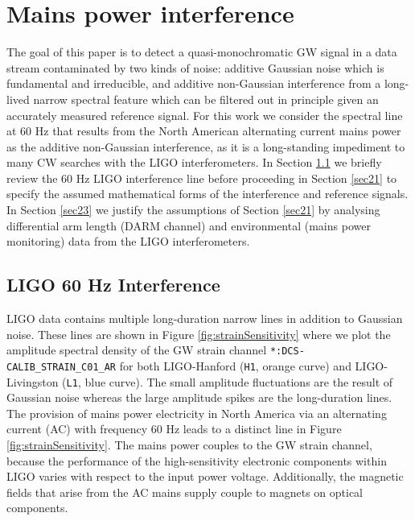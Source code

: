 \documentclass[pra,superscriptaddress,reprint,amsmath,amssymb,nofootinbib]{revtex4-2}
\begin{document}
\section{Mains power interference} \label{sec:pgi}
The goal of this paper is to detect a quasi-monochromatic GW signal in a data stream contaminated by two kinds of noise: additive Gaussian noise which is fundamental and irreducible, and additive non-Gaussian interference from a long-lived narrow spectral feature which can be filtered out in principle given an accurately measured reference signal. For this work we consider the spectral line at 60 Hz that results from the North American alternating current mains power as the additive non-Gaussian interference, as it is a long-standing impediment to many CW searches with the LIGO interferometers. In Section \ref{sec22} we briefly review the 60 Hz LIGO interference line before proceeding in Section \ref{sec21} to specify the assumed mathematical forms of the interference and reference signals. In Section \ref{sec23} we justify the assumptions of Section \ref{sec21} by analysing differential arm length (DARM channel) and environmental (mains power monitoring) data from the LIGO interferometers. 


\subsection{LIGO 60 Hz Interference}  \label{sec22}

LIGO data contains multiple long-duration narrow lines in addition to Gaussian noise. These lines are shown in Figure \ref{fig:strainSensitivity} where we plot the amplitude spectral density of the GW strain channel \texttt{*:DCS-CALIB\_STRAIN\_C01\_AR} for both LIGO-Hanford (\texttt{H1}, orange curve) and LIGO-Livingston (\texttt{L1}, blue curve). The small amplitude fluctuations are the result of Gaussian noise whereas the large amplitude spikes are the long-duration lines. The provision of mains power electricity in North America via an alternating current (AC) with frequency 60 Hz leads to a distinct line in Figure  \ref{fig:strainSensitivity}. The mains power couples to the GW strain channel, because the performance of the high-sensitivity electronic components within LIGO varies with respect to the input power voltage. Additionally, the magnetic fields that arise from the AC mains supply couple to magnets on optical components. \newline 
\end{document}
